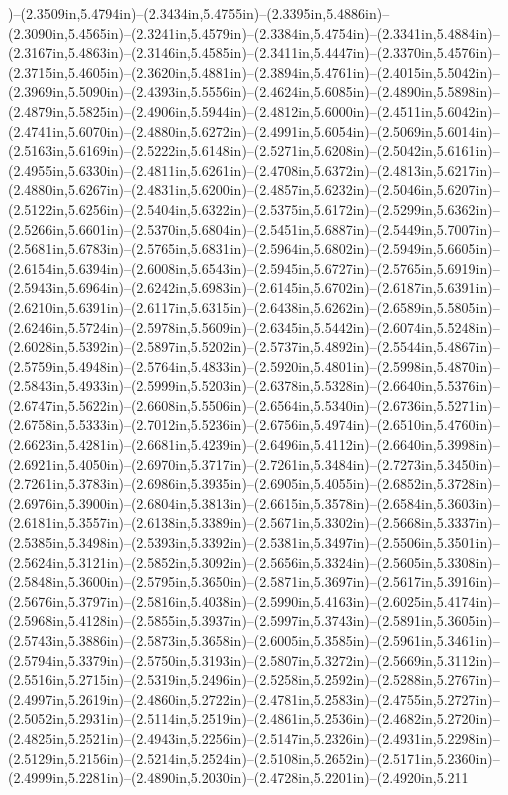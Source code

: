)--(2.3509in,5.4794in)--(2.3434in,5.4755in)--(2.3395in,5.4886in)--(2.3090in,5.4565in)--(2.3241in,5.4579in)--(2.3384in,5.4754in)--(2.3341in,5.4884in)--(2.3167in,5.4863in)--(2.3146in,5.4585in)--(2.3411in,5.4447in)--(2.3370in,5.4576in)--(2.3715in,5.4605in)--(2.3620in,5.4881in)--(2.3894in,5.4761in)--(2.4015in,5.5042in)--(2.3969in,5.5090in)--(2.4393in,5.5556in)--(2.4624in,5.6085in)--(2.4890in,5.5898in)--(2.4879in,5.5825in)--(2.4906in,5.5944in)--(2.4812in,5.6000in)--(2.4511in,5.6042in)--(2.4741in,5.6070in)--(2.4880in,5.6272in)--(2.4991in,5.6054in)--(2.5069in,5.6014in)--(2.5163in,5.6169in)--(2.5222in,5.6148in)--(2.5271in,5.6208in)--(2.5042in,5.6161in)--(2.4955in,5.6330in)--(2.4811in,5.6261in)--(2.4708in,5.6372in)--(2.4813in,5.6217in)--(2.4880in,5.6267in)--(2.4831in,5.6200in)--(2.4857in,5.6232in)--(2.5046in,5.6207in)--(2.5122in,5.6256in)--(2.5404in,5.6322in)--(2.5375in,5.6172in)--(2.5299in,5.6362in)--(2.5266in,5.6601in)--(2.5370in,5.6804in)--(2.5451in,5.6887in)--(2.5449in,5.7007in)--(2.5681in,5.6783in)--(2.5765in,5.6831in)--(2.5964in,5.6802in)--(2.5949in,5.6605in)--(2.6154in,5.6394in)--(2.6008in,5.6543in)--(2.5945in,5.6727in)--(2.5765in,5.6919in)--(2.5943in,5.6964in)--(2.6242in,5.6983in)--(2.6145in,5.6702in)--(2.6187in,5.6391in)--(2.6210in,5.6391in)--(2.6117in,5.6315in)--(2.6438in,5.6262in)--(2.6589in,5.5805in)--(2.6246in,5.5724in)--(2.5978in,5.5609in)--(2.6345in,5.5442in)--(2.6074in,5.5248in)--(2.6028in,5.5392in)--(2.5897in,5.5202in)--(2.5737in,5.4892in)--(2.5544in,5.4867in)--(2.5759in,5.4948in)--(2.5764in,5.4833in)--(2.5920in,5.4801in)--(2.5998in,5.4870in)--(2.5843in,5.4933in)--(2.5999in,5.5203in)--(2.6378in,5.5328in)--(2.6640in,5.5376in)--(2.6747in,5.5622in)--(2.6608in,5.5506in)--(2.6564in,5.5340in)--(2.6736in,5.5271in)--(2.6758in,5.5333in)--(2.7012in,5.5236in)--(2.6756in,5.4974in)--(2.6510in,5.4760in)--(2.6623in,5.4281in)--(2.6681in,5.4239in)--(2.6496in,5.4112in)--(2.6640in,5.3998in)--(2.6921in,5.4050in)--(2.6970in,5.3717in)--(2.7261in,5.3484in)--(2.7273in,5.3450in)--(2.7261in,5.3783in)--(2.6986in,5.3935in)--(2.6905in,5.4055in)--(2.6852in,5.3728in)--(2.6976in,5.3900in)--(2.6804in,5.3813in)--(2.6615in,5.3578in)--(2.6584in,5.3603in)--(2.6181in,5.3557in)--(2.6138in,5.3389in)--(2.5671in,5.3302in)--(2.5668in,5.3337in)--(2.5385in,5.3498in)--(2.5393in,5.3392in)--(2.5381in,5.3497in)--(2.5506in,5.3501in)--(2.5624in,5.3121in)--(2.5852in,5.3092in)--(2.5656in,5.3324in)--(2.5605in,5.3308in)--(2.5848in,5.3600in)--(2.5795in,5.3650in)--(2.5871in,5.3697in)--(2.5617in,5.3916in)--(2.5676in,5.3797in)--(2.5816in,5.4038in)--(2.5990in,5.4163in)--(2.6025in,5.4174in)--(2.5968in,5.4128in)--(2.5855in,5.3937in)--(2.5997in,5.3743in)--(2.5891in,5.3605in)--(2.5743in,5.3886in)--(2.5873in,5.3658in)--(2.6005in,5.3585in)--(2.5961in,5.3461in)--(2.5794in,5.3379in)--(2.5750in,5.3193in)--(2.5807in,5.3272in)--(2.5669in,5.3112in)--(2.5516in,5.2715in)--(2.5319in,5.2496in)--(2.5258in,5.2592in)--(2.5288in,5.2767in)--(2.4997in,5.2619in)--(2.4860in,5.2722in)--(2.4781in,5.2583in)--(2.4755in,5.2727in)--(2.5052in,5.2931in)--(2.5114in,5.2519in)--(2.4861in,5.2536in)--(2.4682in,5.2720in)--(2.4825in,5.2521in)--(2.4943in,5.2256in)--(2.5147in,5.2326in)--(2.4931in,5.2298in)--(2.5129in,5.2156in)--(2.5214in,5.2524in)--(2.5108in,5.2652in)--(2.5171in,5.2360in)--(2.4999in,5.2281in)--(2.4890in,5.2030in)--(2.4728in,5.2201in)--(2.4920in,5.211
